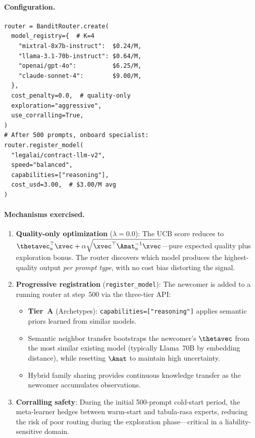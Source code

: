 \paragraph{Configuration.}

{\small\begin{verbatim}
router = BanditRouter.create(
  model_registry={  # K=4
    "mixtral-8x7b-instruct":  $0.24/M,
    "llama-3.1-70b-instruct": $0.64/M,
    "openai/gpt-4o":          $6.25/M,
    "claude-sonnet-4":        $9.00/M,
  },
  cost_penalty=0.0,  # quality-only
  exploration="aggressive",
  use_corralling=True,
)
# After 500 prompts, onboard specialist:
router.register_model(
  "legalai/contract-llm-v2",
  speed="balanced",
  capabilities=["reasoning"],
  cost_usd=3.00,  # $3.00/M avg
)
\end{verbatim}}

\paragraph{Mechanisms exercised.}

\begin{enumerate}[nosep,leftmargin=*]
    \item \textbf{Quality-only optimization} ($\lambda{=}0.0$): The UCB score reduces to $\thetavec_a^\top \xvec + \alpha \sqrt{\xvec^\top \Amat_a^{-1} \xvec}$---pure expected quality plus exploration bonus.  The router discovers which model produces the highest-quality output \emph{per prompt type}, with no cost bias distorting the signal.

    \item \textbf{Progressive registration} (\texttt{register\_model}): The newcomer is added to a running router at step~500 via the three-tier API:
    \begin{itemize}[nosep]
        \item \textbf{Tier~A} (Archetypes): \texttt{capabilities=["reasoning"]} applies semantic priors learned from similar models.
        \item Semantic neighbor transfer bootstraps the newcomer's $\thetavec$ from the most similar existing model (typically Llama~70B by embedding distance), while resetting $\Amat$ to maintain high uncertainty.
        \item Hybrid family sharing provides continuous knowledge transfer as the newcomer accumulates observations.
    \end{itemize}

    \item \textbf{Corralling safety}: During the initial 500-prompt cold-start period, the meta-learner hedges between warm-start and tabula-rasa experts, reducing the risk of poor routing during the exploration phase---critical in a liability-sensitive domain.
\end{enumerate}

